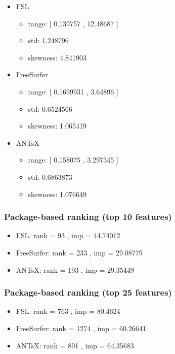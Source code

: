 \documentclass[
  10pt,
]{article}
\begin{document}
\begin{itemize}
\item
  FSL

  \begin{itemize}
  \item
    range: {[} 0.139757 , 12.48687 {]}
  \item
    std: 1.248796
  \item
    skewness: 4.841903
  \end{itemize}
\item
  FreeSurfer

  \begin{itemize}
  \item
    range: {[} 0.1699931 , 3.64896 {]}
  \item
    std: 0.6524566
  \item
    skewness: 1.065419
  \end{itemize}
\item
  ANTsX

  \begin{itemize}
  \item
    range: {[} 0.158075 , 3.297345 {]}
  \item
    std: 0.6863873
  \item
    skewness: 1.076649
  \end{itemize}
\end{itemize}

\hypertarget{package-based-ranking-top-10-features-5}{%
\subsubsection{Package-based ranking (top 10
features)}\label{package-based-ranking-top-10-features-5}}

\begin{itemize}
\item
  FSL: rank = 93 , imp = 44.74012
\item
  FreeSurfer: rank = 233 , imp = 29.08779
\item
  ANTsX: rank = 193 , imp = 29.35449
\end{itemize}

\hypertarget{package-based-ranking-top-25-features-5}{%
\subsubsection{Package-based ranking (top 25
features)}\label{package-based-ranking-top-25-features-5}}

\begin{itemize}
\item
  FSL: rank = 763 , imp = 80.4624
\item
  FreeSurfer: rank = 1274 , imp = 60.26641
\item
  ANTsX: rank = 891 , imp = 64.35683
\end{itemize}
\end{document}
